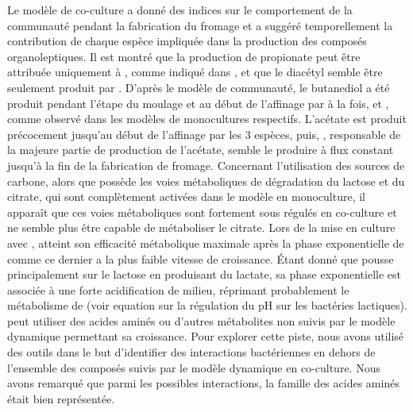 Le modèle de co-culture a donné des indices sur le comportement de la communauté pendant la fabrication du fromage et a suggéré temporellement la contribution de chaque espèce impliquée dans la production des composés organoleptiques. Il est montré que la production de propionate peut être attribuée uniquement à \freud, comme indiqué dans \citep{Cao2021}, et que le diacétyl semble être seulement produit par \lactis. D'après le modèle de communauté, le butanediol a été produit pendant l'étape du moulage et au début de l'affinage par à la fois, \lactis et \plantarum, comme observé dans les modèles de monocultures respectifs. L'acétate est produit précocement jusqu'au début de l'affinage par les 3 espèces, puis, \freud, responsable de la majeure partie de production de l'acétate, semble le produire à flux constant jusqu'à la fin de la fabrication de fromage. Concernant l'utilisation des sources de carbone, alors que \plantarum possède les voies métaboliques de dégradation du lactose et du citrate, qui sont complètement activées dans le modèle en monoculture, il apparaît que ces voies métaboliques sont fortement sous régulés en co-culture et \plantarum ne semble plus être capable de métaboliser le citrate. Lors de la mise en culture avec \lactis, \plantarum atteint son efficacité métabolique maximale après la phase exponentielle de \lactis comme ce dernier a la plus faible vitesse de croissance. Étant donné que \lactis pousse principalement sur le lactose en produisant du lactate, sa phase exponentielle est associée à une forte acidification de milieu, réprimant probablement le métabolisme de \plantarum (voir equation sur la régulation du pH sur les bactéries lactiques). \plantarum peut utiliser des acides aminés ou d'autres métabolites non suivis par le modèle dynamique permettant sa croissance. Pour explorer cette piste, nous avons utilisé des outils dans le but d'identifier des interactions bactériennes en dehors de l'ensemble des composés suivis par le modèle dynamique en co-culture. Nous avons remarqué que parmi les possibles interactions, la famille des acides aminés était bien représentée.\\

